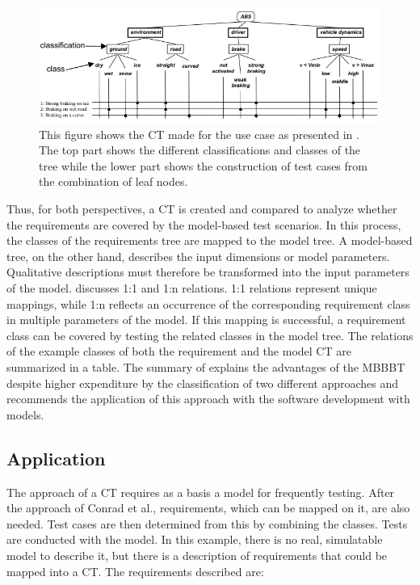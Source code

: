 \begin{figure}[H]
\centering
\includegraphics[scale=0.75]{../../individual/groeger/images/ClassificationTreeExample.png} 
\caption{This figure shows the CT made for the use case as presented in \cite{Conrad}. The top part shows the different classifications and classes of the tree while the lower part shows the construction of test cases from the combination of leaf nodes.}
\label{fig:ABS_CT}
\end{figure}

Thus, for both perspectives, a CT is created and compared to analyze whether the requirements are covered by the model-based test scenarios. In this process, the classes of the requirements tree are mapped to the model tree. A model-based tree, on the other hand, describes the input dimensions or model parameters. Qualitative descriptions must therefore be transformed into the input parameters of the model. \cite{Conrad} discusses 1:1 and 1:n relations. 1:1 relations represent unique mappings, while 1:n reflects an occurrence of the corresponding requirement class in multiple parameters of the model. If this mapping is successful, a requirement class can be covered by testing the related classes in the model tree. The relations of the example classes of both the requirement and the model CT are summarized in a table. The summary of \cite{Conrad} explains the advantages of the MBBBT despite higher expenditure by the classification of two different approaches and recommends the application of this approach with the software development with models.

\subsection{Application}

The approach of a CT requires as a basis a model for frequently testing. After the approach of Conrad et al.\cite{Conrad},  requirements, which can be mapped on it, are also needed. Test cases are then determined from this by combining the classes. Tests are conducted with the model. In this example, there is no real, simulatable model to describe it, but there is a description of requirements that could be mapped into a CT. The requirements described are:

